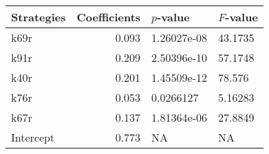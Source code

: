\begin{tabular}{lrll}
\toprule
Strategies &  Coefficients &    $p$-value & $F$-value \\
\midrule
      k69r &         0.093 &  1.26027e-08 &   43.1735 \\
      k91r &         0.209 &  2.50396e-10 &   57.1748 \\
      k40r &         0.201 &  1.45509e-12 &    78.576 \\
      k76r &         0.053 &    0.0266127 &   5.16283 \\
      k67r &         0.137 &  1.81364e-06 &   27.8849 \\
 Intercept &         0.773 &           NA &        NA \\
\bottomrule
\end{tabular}
